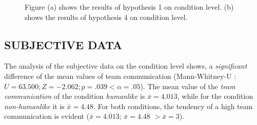 \documentclass[sigchi]{acmart}
\begin{document}
\begin{figure}[]
  \centering
  \qquad
  \caption[Results of hypothesis 1 and 4]{Figure (a) shows the results of hypothesis 1 on condition level. (b) shows the results of hypothesis 4 on condition level.}
  \label{H1H4}
\end{figure}

\newpage
\subsection{SUBJECTIVE DATA}
The analysis of the subjective data on the condition level shows, a \textit{significant} difference of the mean values of team communication (Mann-Whitney-U : $U = 63.500; Z = -2.062; p =.039 < \alpha = .05$). The mean value of the \textit{team communication} of the condition \textit{humanlike} is $\bar{x} = 4.013$, while for the condition \textit{non-humanlike} it is  $\bar{x} = 4.48$. For both conditions, the tendency of a high team communication is evident ($\bar{x} = 4.013$; $\bar{x} = 4.48$ $ > \bar{x} = 3$).
\end{document}
